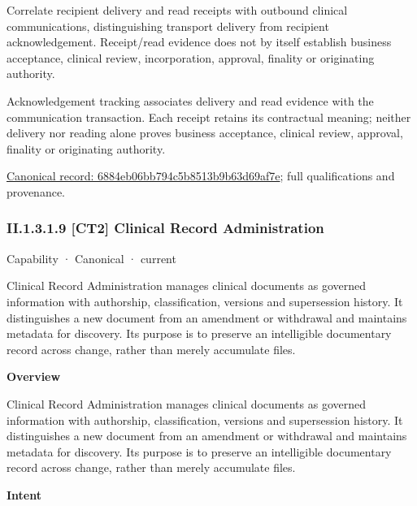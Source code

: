 Correlate recipient delivery and read receipts with outbound clinical communications, distinguishing transport delivery from recipient acknowledgement. Receipt/read evidence does not by itself establish business acceptance, clinical review, incorporation, approval, finality or originating authority.



Acknowledgement tracking associates delivery and read evidence with the communication transaction. Each receipt retains its contractual meaning; neither delivery nor reading alone proves business acceptance, clinical review, approval, finality or originating authority.


{\footnotesize \href{../../../../continuum/strategy/capability/feature/6884eb06bb794c5b8513b9b63d69af7e.md}{Canonical record: 6884eb06bb794c5b8513b9b63d69af7e}; full qualifications and provenance.}\par
\subsubsection*{II.1.3.1.9 [CT2] Clinical Record Administration}
\label{navigation:II.1.3.1.9}

\label{element:ce9e7e7b22054cefb707a650d5be7219}
{\small Capability · Canonical · current}\par

Clinical Record Administration manages clinical documents as governed information with authorship, classification, versions and supersession history. It distinguishes a new document from an amendment or withdrawal and maintains metadata for discovery. Its purpose is to preserve an intelligible documentary record across change, rather than merely accumulate files.



\textbf{Overview}



Clinical Record Administration manages clinical documents as governed information with authorship, classification, versions and supersession history. It distinguishes a new document from an amendment or withdrawal and maintains metadata for discovery. Its purpose is to preserve an intelligible documentary record across change, rather than merely accumulate files.



\textbf{Intent}



